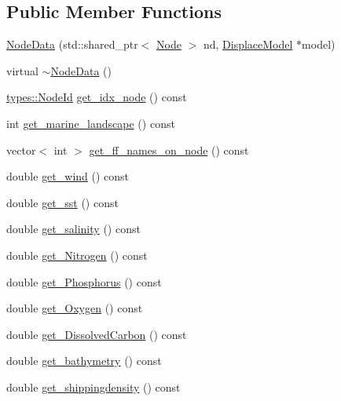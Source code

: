 \subsection*{Public Member Functions}
\begin{DoxyCompactItemize}
\item 
\mbox{\hyperlink{class_node_data_a7a67b993f0da15663ef1b3ce61c9f8c3}{Node\+Data}} (std\+::shared\+\_\+ptr$<$ \mbox{\hyperlink{class_node}{Node}} $>$ nd, \mbox{\hyperlink{class_displace_model}{Displace\+Model}} $\ast$model)
\item 
virtual \mbox{\hyperlink{class_node_data_ad870d466c40b9be96ad79adccab79038}{$\sim$\+Node\+Data}} ()
\item 
\mbox{\hyperlink{classtypes_1_1_node_id}{types\+::\+Node\+Id}} \mbox{\hyperlink{class_node_data_a98838954da8e59f1f91729e61f44608f}{get\+\_\+idx\+\_\+node}} () const
\item 
int \mbox{\hyperlink{class_node_data_a56ca73b90c6526c96359cd0869358ccc}{get\+\_\+marine\+\_\+landscape}} () const
\item 
vector$<$ int $>$ \mbox{\hyperlink{class_node_data_a2e9b8cef08c76eea064d9be28b89494b}{get\+\_\+ff\+\_\+names\+\_\+on\+\_\+node}} () const
\item 
double \mbox{\hyperlink{class_node_data_aecd2dde5e4c1f3b43cca85cb5b545b86}{get\+\_\+wind}} () const
\item 
double \mbox{\hyperlink{class_node_data_ab0fb11992feff6f3d4aeba901c5c984e}{get\+\_\+sst}} () const
\item 
double \mbox{\hyperlink{class_node_data_ad53e5051fbf129cc8cfd0ab82fa5dc56}{get\+\_\+salinity}} () const
\item 
double \mbox{\hyperlink{class_node_data_ac2040a1fe8fc6cf3b43cd0b3039dcd04}{get\+\_\+\+Nitrogen}} () const
\item 
double \mbox{\hyperlink{class_node_data_aec0cbbc536ba9e5dd1987197cb9fe73b}{get\+\_\+\+Phosphorus}} () const
\item 
double \mbox{\hyperlink{class_node_data_a6eda02c831e328accfda9d0dcab7051f}{get\+\_\+\+Oxygen}} () const
\item 
double \mbox{\hyperlink{class_node_data_a09704839d81a8a5f1b2ac63484708e27}{get\+\_\+\+Dissolved\+Carbon}} () const
\item 
double \mbox{\hyperlink{class_node_data_a1f6857f859ac1fecf79db94b7ede82c2}{get\+\_\+bathymetry}} () const
\item 
double \mbox{\hyperlink{class_node_data_a2ae0509c1ad36427721cef2946d0e53f}{get\+\_\+shippingdensity}} () const

\end{DoxyCompactItemize}
